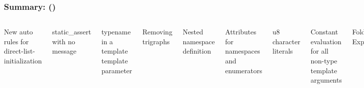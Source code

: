 \begin{frame}[fragile,t]
\frametitle{Summary:  (\Emph{!})}
\begin{columns}[t]

{\scriptsize
New auto rules for direct-list-initialization

static\_assert with no message

typename in a template template parameter

Removing trigraphs

Nested namespace definition

Attributes for namespaces and enumerators

u8 character literals

Constant evaluation for all non-type template arguments

Fold Expressions

Unary fold expressions and empty parameter packs

Remove Deprecated Use of the register Keyword

Remove Deprecated operator++(bool)

Removing Deprecated Exception Specifications from C++17

Make exception specifications part of the type system

Aggregate initialization of classes with base classes

Lambda capture of *this

Using attribute namespaces without repetition

Dynamic memory allocation for over-aligned data

\_\_has\_include in preprocessor conditionals

Template argument deduction for class templates

Non-type template parameters with auto type

Guaranteed copy elision


}
{\scriptsize
New specification for inheriting constructors

Direct-list-initialization of enumerations

Stricter expression evaluation order

constexpr lambda expressions

Different begin and end types in range-based for

Attributes fallthrough, nodiscard, maybe\_unused

}
\end{columns}
\end{frame}
